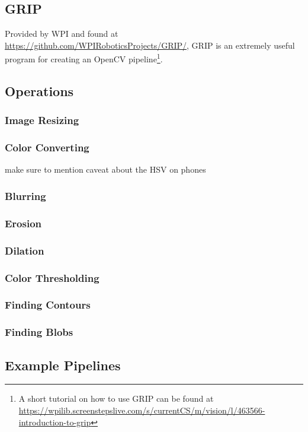 \documentclass[../main.tex]{subfiles}
\begin{document}
\subsection{GRIP}
Provided by WPI and found at \url{https://github.com/WPIRoboticsProjects/GRIP/}, GRIP is an extremely useful program for creating an OpenCV pipeline\footnote{A short tutorial on how to use GRIP can be found at \url{https://wpilib.screenstepslive.com/s/currentCS/m/vision/l/463566-introduction-to-grip}}.
\subsection{Operations}
\subsubsection{Image Resizing}
\subsubsection{Color Converting}
make sure to mention caveat about the HSV on phones
\subsubsection{Blurring}
\subsubsection{Erosion}
\subsubsection{Dilation}
\subsubsection{Color Thresholding}
\subsubsection{Finding Contours}
\subsubsection{Finding Blobs}
\subsection{Example Pipelines}
\end{document}
